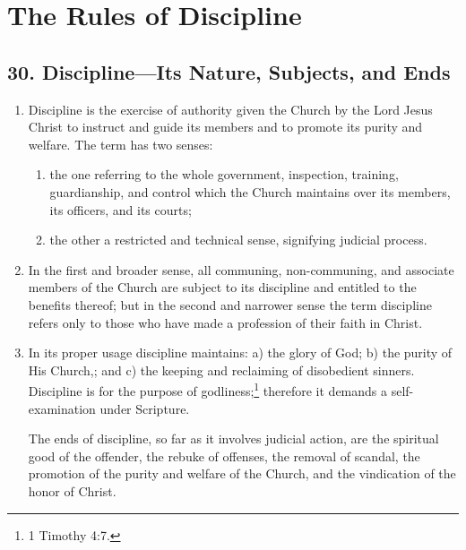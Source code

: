 \documentclass[
]{book}
\providecommand{\tightlist}{%
  \setlength{\itemsep}{0pt}\setlength{\parskip}{0pt}}
\begin{document}
\hypertarget{the-rules-of-discipline}{%
\chapter*{The Rules of Discipline}\label{the-rules-of-discipline}}

\hypertarget{disciplineits-nature-subjects-and-ends}{%
\section*{30. Discipline---Its Nature, Subjects, and Ends}\label{disciplineits-nature-subjects-and-ends}}

\protect\hypertarget{chapter-slug-30-discipline-its-nature-subjects-and-ends}{\href{}{}}

\begin{enumerate}
\def\labelenumi{\arabic{enumi}.}
\item
  \protect\hypertarget{30}{\href{}{}}Discipline is the exercise of authority given the Church by the Lord Jesus Christ to instruct and guide its members and to promote its purity and welfare. The term has two senses:

  \begin{enumerate}
  \def\labelenumii{\alph{enumii}.}
  \tightlist
  \item
    \protect\hypertarget{30.1.a}{\href{}{}}the one referring to the whole government, inspection, training, guardianship, and control which the Church maintains over its members, its officers, and its courts;
  \item
    the other a restricted and technical sense, signifying judicial process.
  \end{enumerate}
\item
  In the first and broader sense, all communing, non-communing, and associate members of the Church are subject to its discipline and entitled to the benefits thereof; but in the second and narrower sense the term discipline refers only to those who have made a profession of their faith in Christ.
\item
  In its proper usage discipline maintains: a) the glory of God; b) the purity of His Church,; and c) the keeping and reclaiming of disobedient sinners. Discipline is for the purpose of godliness;\footnote{1 Timothy 4:7.} therefore it demands a self-examination under Scripture.

  The ends of discipline, so far as it involves judicial action, are the spiritual good of the offender, the rebuke of offenses, the removal of scandal, the promotion of the purity and welfare of the Church, and the vindication of the honor of Christ.
\end{enumerate}
\end{document}

